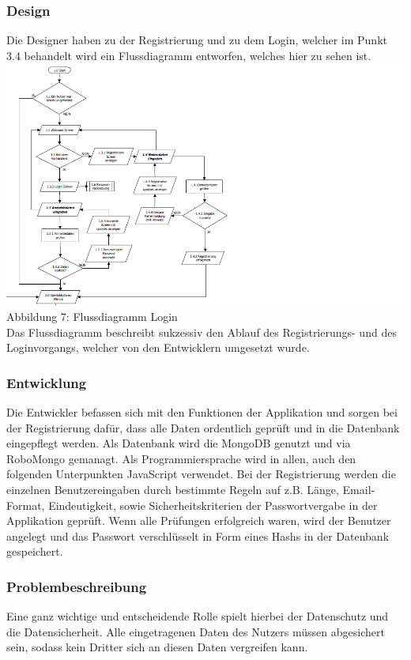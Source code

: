 \documentclass[12pt,a4paper]{article}
\begin{document}
\subsubsection*{Design}
Die Designer haben zu der Registrierung und zu dem Login, welcher im Punkt 3.4 behandelt wird ein Flussdiagramm entworfen, welches hier zu sehen ist.
\includegraphics[scale=0.6, origin=l]{Login-Registrierung.png}
\footnotesize Abbildung 7: Flussdiagramm Login
\normalsize
\\
\linebreak
Das Flussdiagramm beschreibt sukzessiv den Ablauf des Registrierungs- und des Loginvorgangs, welcher von den Entwicklern umgesetzt wurde.
\subsubsection*{Entwicklung}
Die Entwickler befassen sich mit den Funktionen der Applikation  und sorgen bei der Registrierung dafür, dass alle Daten ordentlich geprüft und in die Datenbank eingepflegt werden.
Als Datenbank wird die MongoDB genutzt und via RoboMongo gemanagt. Als Programmiersprache wird in allen, auch den folgenden Unterpunkten JavaScript verwendet.
Bei der Registrierung werden die einzelnen Benutzereingaben durch bestimmte Regeln auf z.B. Länge, Email-Format, Eindeutigkeit, sowie Sicherheitskriterien der Passwortvergabe in der Applikation geprüft.
Wenn alle Prüfungen erfolgreich waren, wird der Benutzer angelegt und das Passwort verschlüsselt in Form eines Hashs in der Datenbank gespeichert.
\subsubsection*{Problembeschreibung} 
Eine ganz wichtige und entscheidende Rolle spielt hierbei der Datenschutz und die Datensicherheit. Alle eingetragenen Daten des Nutzers müssen abgesichert sein, sodass kein Dritter sich an diesen Daten vergreifen kann.
\newpage
\end{document}
